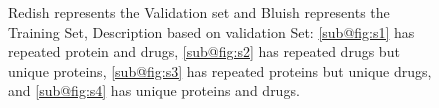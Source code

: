 \begin{figure}[tbp]
    \centering
    \caption[Different Settings Of Training and Validation Sets]{
        Redish represents the Validation set and Bluish represents the Training Set, Description based on validation Set: \ref{sub@fig:s1} has repeated protein and drugs, \ref{sub@fig:s2} has repeated drugs but unique proteins, \ref{sub@fig:s3} has repeated proteins but unique drugs, and \ref{sub@fig:s4} has unique proteins and drugs.
        }
    \label{fig:train_val}
\end{figure}

